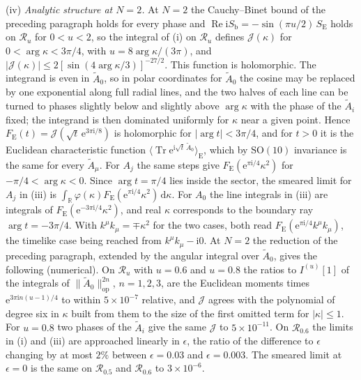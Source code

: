 (iv) \emph{Analytic structure at \(N=2\).} At \(N=2\) the Cauchy--Binet bound of the preceding paragraph holds for every phase and \(\operatorname{Re}\mathrm iS_{\mathrm b}=-\sin(\pi u/2)\,S_{\mathrm E}\) holds on \(\mathcal R_u\) for \(0<u<2\), so the integral of (i) on \(\mathcal R_u\) defines \(\mathcal J(\kappa)\) for \(0<\arg\kappa<3\pi/4\), with \(u=8\arg\kappa/(3\pi)\), and \(|\mathcal J(\kappa)|\le2[\sin(4\arg\kappa/3)]^{-27/2}\). This function is holomorphic. The integrand is even in \(\tilde A_0\), so in polar coordinates for \(\tilde A_0\) the cosine may be replaced by one exponential along full radial lines, and the two halves of each line can be turned to phases slightly below and slightly above \(\arg\kappa\) with the phase of the \(\tilde A_i\) fixed; the integrand is then dominated uniformly for \(\kappa\) near a given point. Hence \(F_{\mathrm E}(t)=\mathcal J(\sqrt t\,\mathrm e^{3\pi\mathrm i/8})\) is holomorphic for \(|\arg t|<3\pi/4\), and for \(t>0\) it is the Euclidean characteristic function \(\langle\operatorname{Tr}\mathrm e^{\mathrm i\sqrt t\,\tilde A_0}\rangle_{\mathrm E}\), which by \(\mathrm{SO}(10)\) invariance is the same for every \(\tilde A_\mu\). For \(A_j\) the same steps give \(F_{\mathrm E}(\mathrm e^{\pi\mathrm i/4}\kappa^2)\) for \(-\pi/4<\arg\kappa<0\). Since \(\arg t=\pi/4\) lies inside the sector, the smeared limit for \(A_j\) in (iii) is \(\int_{\mathbb R}\varphi(\kappa)F_{\mathrm E}(\mathrm e^{\pi\mathrm i/4}\kappa^2)\,\mathrm d\kappa\). For \(A_0\) the line integrals in (iii) are integrals of \(F_{\mathrm E}(\mathrm e^{-3\pi\mathrm i/4}\kappa^2)\), and real \(\kappa\) corresponds to the boundary ray \(\arg t=-3\pi/4\). With \(k^\mu k_\mu=\mp\kappa^2\) for the two cases, both read \(F_{\mathrm E}(\mathrm e^{\pi\mathrm i/4}k^\mu k_\mu)\), the timelike case being reached from \(k^\mu k_\mu-\mathrm i0\). At \(N=2\) the reduction of the preceding paragraph, extended by the angular integral over \(\tilde A_0\), gives the following (numerical). On \(\mathcal R_u\) with \(u=0.6\) and \(u=0.8\) the ratios to \(I^{(u)}[1]\) of the integrals of \(\|\tilde A_0\|_{\mathrm{op}}^{2n}\), \(n=1,2,3\), are the Euclidean moments times \(\mathrm e^{3\pi\mathrm in(u-1)/4}\) to within \(5\times10^{-7}\) relative, and \(\mathcal J\) agrees with the polynomial of degree six in \(\kappa\) built from them to the size of the first omitted term for \(|\kappa|\le1\). For \(u=0.8\) two phases of the \(\tilde A_i\) give the same \(\mathcal J\) to \(5\times10^{-11}\). On \(\mathcal R_{0.6}\) the limits in (i) and (iii) are approached linearly in \(\epsilon\), the ratio of the difference to \(\epsilon\) changing by at most \(2\%\) between \(\epsilon=0.03\) and \(\epsilon=0.003\). The smeared limit at \(\epsilon=0\) is the same on \(\mathcal R_{0.5}\) and \(\mathcal R_{0.6}\) to \(3\times10^{-6}\).

